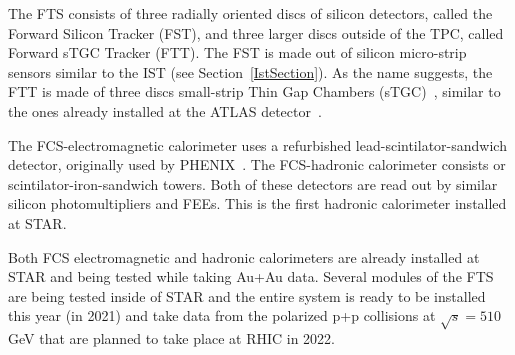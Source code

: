  The FTS consists of three radially oriented discs of silicon detectors, called the Forward Silicon Tracker (FST), and three larger discs outside of the TPC, called Forward sTGC Tracker (FTT)\@. The FST is made out of silicon micro-strip sensors similar to the IST (see Section~\ref{IstSection})\@. As the name suggests, the FTT is made of three discs small-strip Thin Gap Chambers (sTGC)~\cite{FTTproceedings}, similar to the ones already installed at the ATLAS detector~\cite{AtlasStgc}\@.
 
 The FCS-electromagnetic calorimeter uses a refurbished lead-scintilator-sandwich detector, originally used by PHENIX~\cite{PhenixCalorimeter}. The FCS-hadronic calorimeter consists or scintilator-iron-sandwich towers. Both of these detectors are read out by similar silicon photomultipliers and FEEs. This is the first hadronic calorimeter installed at STAR\@.
 
 Both FCS electromagnetic and hadronic calorimeters are already installed at STAR and being tested while taking Au+Au data. Several modules of the FTS are being tested inside of STAR and the entire system is ready to be installed this year (in 2021) and take data from the polarized p+p collisions at $\sqrt{s} = 510\,$GeV that are planned to take place at RHIC in 2022\@. 




